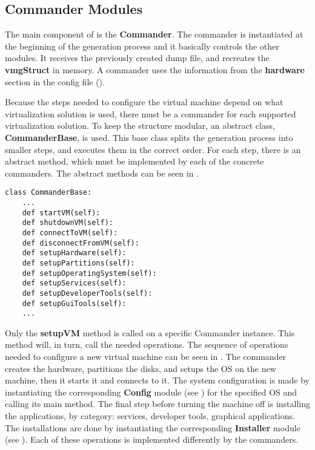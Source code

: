 \subsection{Commander Modules}
\label{sub-sec:commanders}
The main component of \project is the \textbf{Commander}. The commander is
instantiated at the beginning of the generation process and it basically
controls the other modules. It receives the previously created dump file, and
recreates the \textbf{vmgStruct} in memory. A commander uses the information
from the \textbf{hardware} section in the config file
(). 

Because the steps needed to configure the virtual machine depend on what
virtualization solution is used, there must be a commander for each supported
virtualization solution. To keep the structure modular, an abstract class,
\textbf{CommanderBase}, is used. This base class splits the generation process
into smaller steps, and executes them in the correct order. For each step,
there is an abstract method, which must be implemented by each of the concrete
commanders. The abstract methods can be seen in
.

\lstset{language=Python,caption=CommanderBase methods,label=lst:commander-methods}
\begin{lstlisting}
class CommanderBase:
	...
	def startVM(self):
	def shutdownVM(self):
	def connectToVM(self):
	def disconnectFromVM(self):
	def setupHardware(self):
	def setupPartitions(self):
	def setupOperatingSystem(self):
	def setupServices(self):
	def setupDeveloperTools(self):
	def setupGuiTools(self):
	...
\end{lstlisting}

Only the \textbf{setupVM} method is called on a specific Commander instance.
This method will, in turn, call the needed operations. The sequence of
operations needed to configure a new virtual machine can be seen in
. The commander creates the hardware,
partitions the disks, and setups the OS on the new machine, then it starts it
and connects to it. The system configuration is made by instantiating the
corresponding \textbf{Config} module (see
) for the specified OS and calling
its main method. The final step before turning the machine off is installing
the applications, by category: services, developer tools, graphical
applications. The installations are done by instantiating the corresponding
\textbf{Installer} module (see ).
Each of these operations is implemented differently by the commanders.

